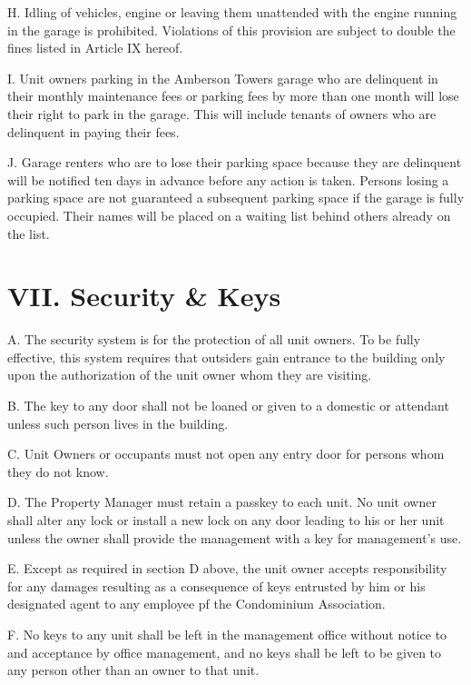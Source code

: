 \documentclass[
]{book}
\begin{document}
H. Idling of vehicles, engine or leaving them unattended with the engine running in the garage is prohibited. Violations of this provision are subject to double the fines listed in Article IX hereof.

I. Unit owners parking in the Amberson Towers garage who are delinquent in their monthly maintenance fees or parking fees by more than one month will lose their right to park in the garage. This will include tenants of owners who are delinquent in paying their fees.

J. Garage renters who are to lose their parking space because they are delinquent will be notified ten days in advance before any action is taken. Persons losing a parking space are not guaranteed a subsequent parking space if the garage is fully occupied. Their names will be placed on a waiting list behind others already on the list.

\hypertarget{vii.-security-keys}{%
\section*{VII. Security \& Keys}\label{vii.-security-keys}}

A. The security system is for the protection of all unit owners. To be fully effective, this system requires that outsiders gain entrance to the building only upon the authorization of the unit owner whom they are visiting.

B. The key to any door shall not be loaned or given to a domestic or attendant unless such person lives in the building.

C. Unit Owners or occupants must not open any entry door for persons whom they do not know.

D. The Property Manager must retain a passkey to each unit. No unit owner shall alter any lock or install a new lock on any door leading to his or her unit unless the owner shall provide the management with a key for management's use.

E. Except as required in section D above, the unit owner accepts responsibility for any damages resulting as a consequence of keys entrusted by him or his designated agent to any employee pf the Condominium Association.

F. No keys to any unit shall be left in the management office without notice to and acceptance by office management, and no keys shall be left to be given to any person other than an owner to that unit.
\end{document}
